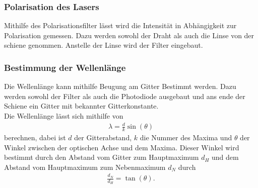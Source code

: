 \subsubsection{Polarisation des Lasers}
Mithilfe des Polarisationsfilter lässt wird die Intensität in Abhängigkeit zur Polarisation gemessen. Dazu werden sowohl der Draht als auch die Linse von der schiene genommen. Anstelle der Linse wird der Filter eingebaut.
\subsubsection{Bestimmung der Wellenlänge}
Die Wellenlänge kann mithilfe Beugung am Gitter Bestimmt werden. Dazu werden sowohl der Filter als auch die Photodiode ausgebaut und ans ende der Schiene ein Gitter mit bekannter Gitterkonstante.\\
Die Wellenlänge lässt sich mithilfe von
\begin{align}
\lambda=\frac{d}{k}\sin\left(  \theta \right)
\end{align}
berechnen, dabei ist $d$ der Gitterabstand, $k$ die Nummer des Maxima und $\theta$ der Winkel zwischen der optischen Achse und dem Maxima. Dieser Winkel wird bestimmt durch den Abstand vom Gitter zum Hauptmaximum $d_H$ und dem Abstand vom  Hauptmaximum zum Nebenmaximum $d_N$ durch
\begin{align*}
\frac{d_{N}}{d_{H}}=\tan\left( \theta \right).
\end{align*}